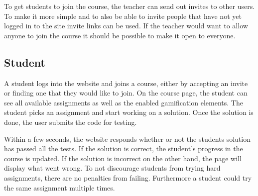 To get students to join the course, the teacher can send out invites to other users. To make it more simple and to also be able to invite people that have not yet logged in to the site invite links can be used. If the teacher would want to allow anyone to join the course it should be possible to make it open to everyone.


\subsection{Student}
A student logs into the website and joins a course, either by accepting an invite or finding one that they would like to join. On the course page, the student can see all available assignments as well as the enabled gamification elements. The student picks an assignment and start working on a solution. Once the solution is done, the user submits the code for testing.

Within a few seconds, the website responds whether or not the students solution has passed all the tests. If the solution is correct, the student's progress in the course is updated. If the solution is incorrect on the other hand, the page will display what went wrong. To not discourage students from trying hard assignments, there are no penalties from failing. Furthermore a student could try the same assignment multiple times.
